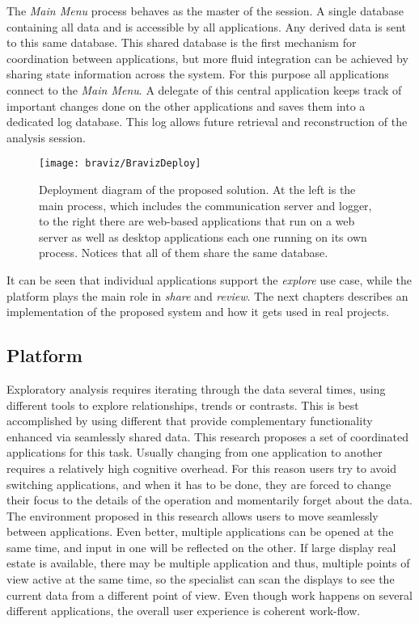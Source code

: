 The \emph{Main Menu} process behaves as the master of the session. A single database containing all data and is accessible by all applications. Any derived data is sent to this same database. This shared database is the first mechanism for coordination between applications, but more fluid integration can be achieved by sharing state information across the system. For this purpose all applications connect to the \emph{Main Menu}. A delegate of this central application keeps track of important changes done on the other applications and saves them into a dedicated log database. This log allows future retrieval and reconstruction of the analysis session.

\begin{figure}

\centering
\texttt{[image: braviz/BravizDeploy]}
\caption{\label{fig_deployment} Deployment diagram of the proposed solution. At the left is the main process, which includes the communication server and logger, to the right there are web-based applications that run on a web server as well as desktop applications each one running on its own process. Notices that all of them share the same database.}
\end{figure}
 
It can be seen that individual applications support the \emph{explore} use case, while the platform plays the main role in \emph{share} and \emph{review}. The next chapters describes an implementation of the proposed system and how it gets used in real projects.

\subsection{Platform}

Exploratory analysis requires iterating through the data several times, using different tools to explore relationships, trends or contrasts. This is best accomplished by using different that provide complementary functionality  enhanced via seamlessly shared data. This research proposes a set of coordinated applications for this task. Usually changing from one application to another requires a relatively high cognitive overhead. For this reason users try to avoid switching applications, and when it has to be done, they are forced to change their focus to the details of the operation and momentarily forget about the data. The environment proposed in this research allows users to move seamlessly between applications. Even better, multiple applications can be opened at the same time, and input in one will be reflected on the other. If large display real estate is available, there may be multiple application and thus, multiple  points of view active at the same time, so the specialist can scan the displays to see the current data from a different point of view. Even though work happens on several different applications, the overall user experience is coherent work-flow. 

